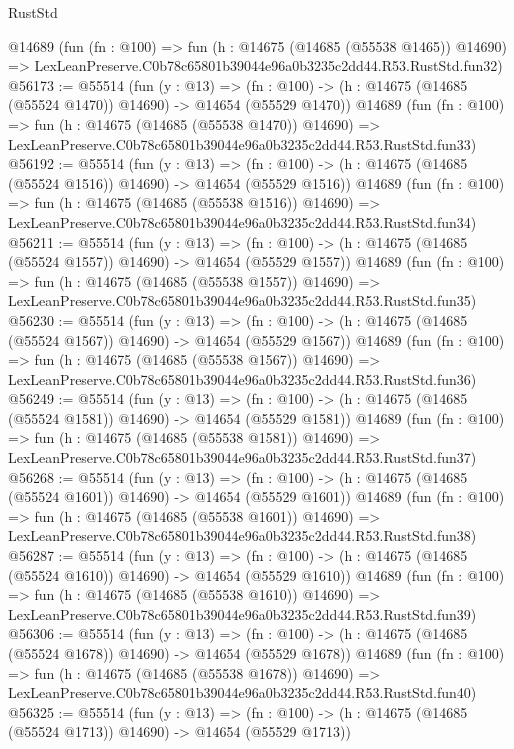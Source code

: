 \begin{lexlean}{RustStd}
\begin{coremodule}
    @14689
    (fun (fn : @100) =>
    fun (h : @14675 (@14685 (@55538 @1465)) @14690) =>
    LexLeanPreserve.C0b78c65801b39044e96a0b3235c2dd44.R53.RustStd.fun32)
@56173 := @55514
    (fun (y : @13) =>
    (fn : @100) -> (h : @14675 (@14685 (@55524 @1470)) @14690) -> @14654 (@55529 @1470))
    @14689
    (fun (fn : @100) =>
    fun (h : @14675 (@14685 (@55538 @1470)) @14690) =>
    LexLeanPreserve.C0b78c65801b39044e96a0b3235c2dd44.R53.RustStd.fun33)
@56192 := @55514
    (fun (y : @13) =>
    (fn : @100) -> (h : @14675 (@14685 (@55524 @1516)) @14690) -> @14654 (@55529 @1516))
    @14689
    (fun (fn : @100) =>
    fun (h : @14675 (@14685 (@55538 @1516)) @14690) =>
    LexLeanPreserve.C0b78c65801b39044e96a0b3235c2dd44.R53.RustStd.fun34)
@56211 := @55514
    (fun (y : @13) =>
    (fn : @100) -> (h : @14675 (@14685 (@55524 @1557)) @14690) -> @14654 (@55529 @1557))
    @14689
    (fun (fn : @100) =>
    fun (h : @14675 (@14685 (@55538 @1557)) @14690) =>
    LexLeanPreserve.C0b78c65801b39044e96a0b3235c2dd44.R53.RustStd.fun35)
@56230 := @55514
    (fun (y : @13) =>
    (fn : @100) -> (h : @14675 (@14685 (@55524 @1567)) @14690) -> @14654 (@55529 @1567))
    @14689
    (fun (fn : @100) =>
    fun (h : @14675 (@14685 (@55538 @1567)) @14690) =>
    LexLeanPreserve.C0b78c65801b39044e96a0b3235c2dd44.R53.RustStd.fun36)
@56249 := @55514
    (fun (y : @13) =>
    (fn : @100) -> (h : @14675 (@14685 (@55524 @1581)) @14690) -> @14654 (@55529 @1581))
    @14689
    (fun (fn : @100) =>
    fun (h : @14675 (@14685 (@55538 @1581)) @14690) =>
    LexLeanPreserve.C0b78c65801b39044e96a0b3235c2dd44.R53.RustStd.fun37)
@56268 := @55514
    (fun (y : @13) =>
    (fn : @100) -> (h : @14675 (@14685 (@55524 @1601)) @14690) -> @14654 (@55529 @1601))
    @14689
    (fun (fn : @100) =>
    fun (h : @14675 (@14685 (@55538 @1601)) @14690) =>
    LexLeanPreserve.C0b78c65801b39044e96a0b3235c2dd44.R53.RustStd.fun38)
@56287 := @55514
    (fun (y : @13) =>
    (fn : @100) -> (h : @14675 (@14685 (@55524 @1610)) @14690) -> @14654 (@55529 @1610))
    @14689
    (fun (fn : @100) =>
    fun (h : @14675 (@14685 (@55538 @1610)) @14690) =>
    LexLeanPreserve.C0b78c65801b39044e96a0b3235c2dd44.R53.RustStd.fun39)
@56306 := @55514
    (fun (y : @13) =>
    (fn : @100) -> (h : @14675 (@14685 (@55524 @1678)) @14690) -> @14654 (@55529 @1678))
    @14689
    (fun (fn : @100) =>
    fun (h : @14675 (@14685 (@55538 @1678)) @14690) =>
    LexLeanPreserve.C0b78c65801b39044e96a0b3235c2dd44.R53.RustStd.fun40)
@56325 := @55514
    (fun (y : @13) =>
    (fn : @100) -> (h : @14675 (@14685 (@55524 @1713)) @14690) -> @14654 (@55529 @1713))

\end{coremodule}
\end{lexlean}
